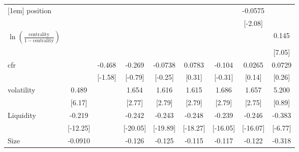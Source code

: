 {\begin{tabular}{l*{8}{c}}
[1em]
position            &                     &                     &                     &                     &                     &                     &     -0.0575         &                     \\
                    &                     &                     &                     &                     &                     &                     &     [-2.08]         &                     \\
[1em]
 $ \ln(\frac{\text{centrality}}{1-\text{centrality}}) $&                     &                     &                     &                     &                     &                     &                     &       0.145\sym{***}\\
                    &                     &                     &                     &                     &                     &                     &                     &      [7.05]         \\
[1em]
cfr                 &                     &      -0.468         &      -0.269         &     -0.0738         &      0.0783         &      -0.104         &      0.0265         &      0.0729         \\
                    &                     &     [-1.58]         &     [-0.79]         &     [-0.25]         &      [0.31]         &     [-0.31]         &      [0.14]         &      [0.26]         \\
[1em]
volatility          &       0.489\sym{**} &                     &       1.654\sym{*}  &       1.616\sym{*}  &       1.615\sym{*}  &       1.686\sym{*}  &       1.657\sym{*}  &       5.200         \\
                    &      [6.17]         &                     &      [2.77]         &      [2.79]         &      [2.79]         &      [2.79]         &      [2.75]         &      [0.89]         \\
[1em]
Liquidity           &      -0.219\sym{***}&                     &      -0.242\sym{***}&      -0.243\sym{***}&      -0.248\sym{***}&      -0.239\sym{***}&      -0.246\sym{***}&      -0.383\sym{**} \\
                    &    [-12.25]         &                     &    [-20.05]         &    [-19.89]         &    [-18.27]         &    [-16.05]         &    [-16.07]         &     [-6.77]         \\
[1em]
Size                &     -0.0910\sym{**} &                     &      -0.126\sym{**} &      -0.125\sym{**} &      -0.115\sym{*}  &      -0.117\sym{*}  &      -0.122\sym{*}  &      -0.318\sym{**} \\

\end{tabular}}

